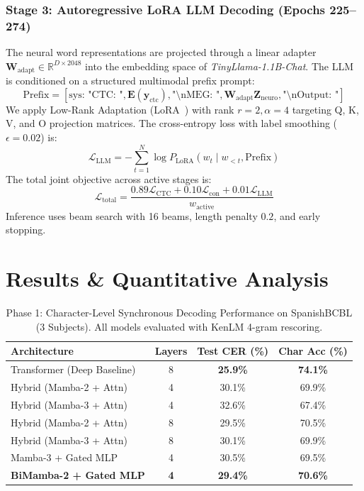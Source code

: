 \documentclass[conference]{IEEEtran}
\begin{document}
\subsubsection{Stage 3: Autoregressive LoRA LLM Decoding (Epochs 225--274)}
The neural word representations are projected through a linear adapter $\mathbf{W}_{\text{adapt}} \in \mathbb{R}^{D \times 2048}$ into the embedding space of \textit{TinyLlama-1.1B-Chat}. The LLM is conditioned on a structured multimodal prefix prompt:
$$\text{Prefix} = [\text{sys: "CTC: "}, \mathbf{E}(\mathbf{y}_{\text{ctc}}), \text{"\textbackslash nMEG: "}, \mathbf{W}_{\text{adapt}}\mathbf{Z}_{\text{neuro}}, \text{"\textbackslash nOutput: "}]$$
We apply Low-Rank Adaptation (LoRA~\cite{lora}) with rank $r=2, \alpha=4$ targeting Q, K, V, and O projection matrices. The cross-entropy loss with label smoothing ($\epsilon = 0.02$) is:
\begin{equation}
    \mathcal{L}_{\text{LLM}} = -\sum_{t=1}^{N} \log P_{\text{LoRA}}(w_t \mid w_{<t}, \text{Prefix})
\end{equation}
The total joint objective across active stages is:
\begin{equation}
    \mathcal{L}_{\text{total}} = \frac{0.89 \mathcal{L}_{\text{CTC}} + 0.10 \mathcal{L}_{\text{con}} + 0.01 \mathcal{L}_{\text{LLM}}}{w_{\text{active}}}
\end{equation}
Inference uses beam search with 16 beams, length penalty $0.2$, and early stopping.

\section{Results \& Quantitative Analysis}
\label{sec:results}

\begin{table}[t]
\centering
\caption{Phase 1: Character-Level Synchronous Decoding Performance on SpanishBCBL (3 Subjects). All models evaluated with KenLM 4-gram rescoring.}
\label{tab:results_phase1}
\begin{tabular}{@{}lccc@{}}
\toprule
\textbf{Architecture} & \textbf{Layers} & \textbf{Test CER (\%)} & \textbf{Char Acc (\%)} \\
\midrule
Transformer (Deep Baseline) & 8 & \textbf{25.9\%} & \textbf{74.1\%} \\
\midrule
Hybrid (Mamba-2 + Attn) & 4 & 30.1\% & 69.9\% \\
Hybrid (Mamba-3 + Attn) & 4 & 32.6\% & 67.4\% \\
Hybrid (Mamba-2 + Attn) & 8 & 29.5\% & 70.5\% \\
Hybrid (Mamba-3 + Attn) & 8 & 30.1\% & 69.9\% \\
Mamba-3 + Gated MLP & 4 & 30.5\% & 69.5\% \\
\textbf{BiMamba-2 + Gated MLP} & \textbf{4} & \textbf{29.4\%} & \textbf{70.6\%} \\
\bottomrule
\end{tabular}
\end{table}
\end{document}
